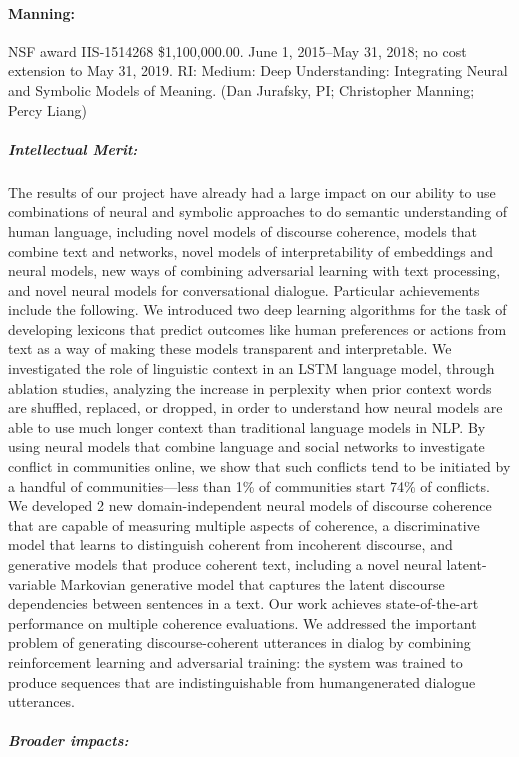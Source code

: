 \documentclass{article}
\begin{document}
\paragraph{Manning:} NSF award IIS-1514268 \$1,100,000.00. June 1, 2015--May 31, 2018; no cost extension to May 31, 2019. RI: Medium: Deep Understanding: Integrating Neural and Symbolic Models of Meaning. (Dan Jurafsky, PI; Christopher Manning; Percy Liang)

\subparagraph{Intellectual Merit:} The results of our project have already had a large impact on our ability to use combinations of neural and symbolic approaches to do semantic understanding of human language, including novel models of discourse coherence, models that combine text and networks, novel models of interpretability of embeddings and neural models, new ways of combining adversarial learning with text processing, and novel neural models for conversational dialogue. Particular achievements include the following. We introduced two deep learning algorithms for the task of developing lexicons that predict outcomes like human preferences or actions from text as a way of making these models transparent and interpretable. We investigated the role of linguistic context in an LSTM language model, through ablation studies, analyzing the increase in perplexity when prior context words are shuffled, replaced, or dropped, in order to understand how neural models are able to use much longer context than traditional language models in NLP. By using neural models that combine language and social networks to investigate conflict in communities online, we show that such conflicts tend to be initiated by a handful of communities—less than 1\% of communities start 74\% of conflicts. We developed 2 new domain-independent neural models of discourse coherence that are capable of measuring multiple aspects of coherence, a discriminative model that learns to distinguish coherent from incoherent discourse, and generative models that produce coherent text, including a novel neural latent-variable Markovian generative model that captures the latent discourse dependencies between sentences in a text. Our work achieves state-of-the-art performance on multiple coherence evaluations. We addressed the important problem of generating discourse-coherent utterances in dialog by combining reinforcement learning and adversarial training: the system was trained to produce sequences that are indistinguishable from humangenerated dialogue utterances.

\subparagraph{Broader impacts:} 
\end{document}
